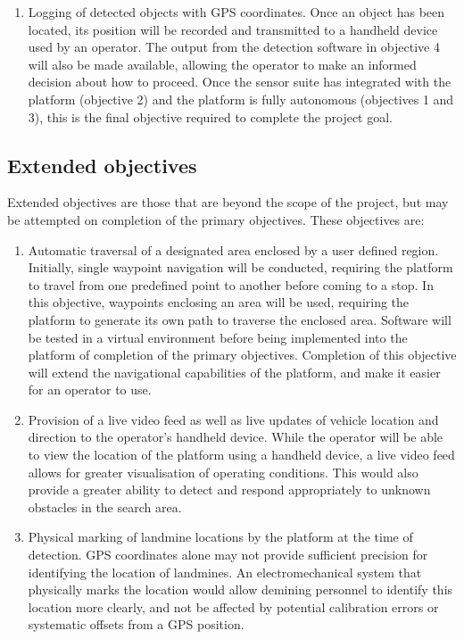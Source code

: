 \documentclass[main.tex]{subfiles}
\begin{document}
\begin{enumerate}
\item Logging of detected objects with GPS coordinates. Once an object has been located, its position will be recorded and transmitted to a handheld device used by an operator. The output from the detection software in objective 4 will also be made available, allowing the operator to make an informed decision about how to proceed. Once the sensor suite has integrated with the platform (objective 2) and the platform is fully autonomous (objectives 1 and 3), this is the final objective required to complete the project goal.
\end{enumerate}

\subsection{Extended objectives}
Extended objectives are those that are beyond the scope of the project, but may be attempted on completion of the primary objectives. These objectives are:

\begin{enumerate}
\item Automatic traversal of a designated area enclosed by a user defined region. Initially, single waypoint navigation will be conducted, requiring the platform to travel from one predefined point to another before coming to a stop. In this objective, waypoints enclosing an area will be used, requiring the platform to generate its own path to traverse the enclosed area. Software will be tested in a virtual environment before being implemented into the platform of completion of the primary objectives. Completion of this objective will extend the navigational capabilities of the platform, and make it easier for an operator to use. 

\item Provision of a live video feed as well as live updates of vehicle location and direction to the operator's handheld device. While the operator will be able to view the location of the platform using a handheld device, a live video feed allows for greater visualisation of operating conditions. This would also provide a greater ability to detect and respond appropriately to unknown obstacles in the search area.

\item Physical marking of landmine locations by the platform at the time of detection. GPS coordinates alone may not provide sufficient precision for identifying the location of landmines. An electromechanical system that physically marks the location would allow demining personnel to identify this location more clearly, and not be affected by potential calibration errors or systematic offsets from a GPS position.
\end{enumerate}
\end{document}
